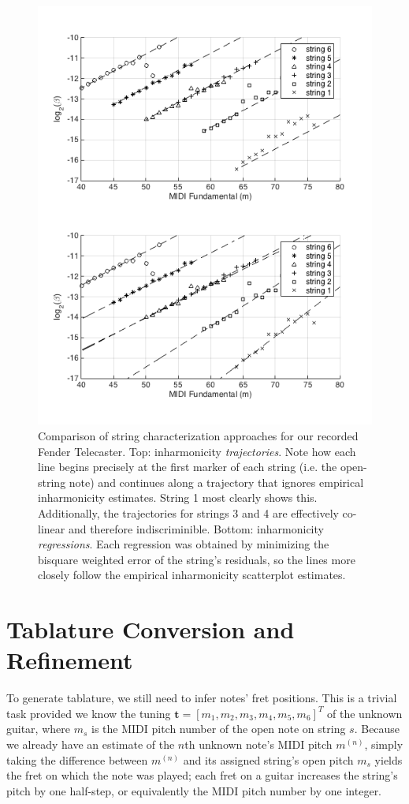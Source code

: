 \documentclass[12pt]{cmuthesis}
\begin{document}
\begin{figure}[!htbp] 
\label{fig:traj-v-reg}
\centering
\includegraphics[scale=0.75]{traj-v-reg}
\caption{Comparison of string characterization approaches for our recorded Fender Telecaster. Top: inharmonicity \textit{trajectories}. Note how each line begins precisely at the first marker of each string (i.e. the open-string note) and continues along a trajectory that ignores empirical inharmonicity estimates. String 1 most clearly shows this. Additionally, the trajectories for strings 3 and 4 are effectively co-linear and therefore indiscriminible. Bottom: inharmonicity \textit{regressions}. Each regression was obtained by minimizing the bisquare weighted error of the string's residuals, so the lines more closely follow the empirical inharmonicity scatterplot estimates.}
\end{figure}

\section{Tablature Conversion and Refinement}
To generate tablature, we still need to infer notes' fret positions. This is a trivial task provided we know the tuning $\mathbf{t} = [m_1, m_2, m_3, m_4, m_5, m_6]^T$ of the unknown guitar, where $m_s$ is the MIDI pitch number of the open note on string $s$. Because we already have an estimate of the $n$th unknown note's MIDI pitch $m^{(n)}$, simply taking the difference between $m^{(n)}$ and its assigned string's open pitch $m_s$ yields the fret on which the note was played; each fret on a guitar increases the string's pitch by one half-step, or equivalently the MIDI pitch number by one integer.
\end{document}

